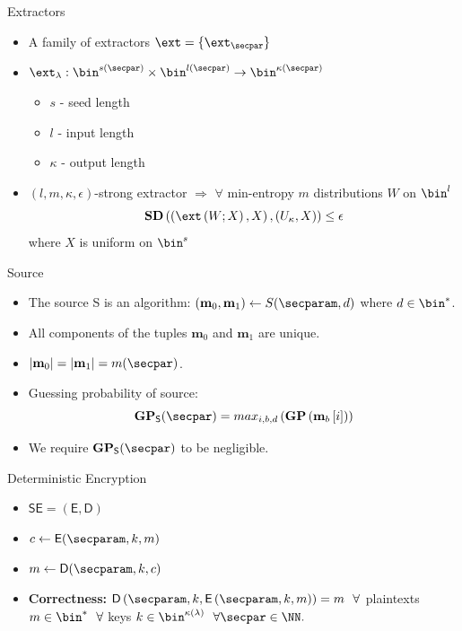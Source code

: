 \documentclass{beamer}
\newcommand{\smzero}{\textbf{m}_0}
\newcommand{\smone}{\textbf{m}_1}
\begin{document}
\begin{frame}{Extractors}
	\begin{itemize}
		\setlength\itemsep{1em}
		\item A family of extractors $\ext = \{\ext_{\secpar}\}$
		\item $\ext_{\lambda} : \bin^{s(\secpar)} \times \bin^{l(\secpar)} \rightarrow \bin^{\kappa(\secpar)}$
		\begin{itemize}
		    \item $s$ - seed length
		    \item $l$ - input length 
		    \item $\kappa$ - output length
		\end{itemize}
		\item $(l,m,\kappa,\epsilon)$-strong extractor $\Rightarrow$ $\forall$ min-entropy  $m$ distributions $W$ on $\bin^l$
		    \begin{equation*}
		        \textbf{SD}\left(\left( \ext\left( W; X\right), X \right), \left( U_\kappa,X \right) \right) \leq \epsilon
		    \end{equation*}
		 where $X$ is uniform on $\bin^s$
	\end{itemize}
\end{frame}

\begin{frame}{Source}
	\begin{itemize}
		\setlength\itemsep{1em}
		\item The source S is an algorithm: $(\smzero, \smone) \leftarrow S(\secparam, d)$ where $d \in \bin^*$.
		\item All components of the tuples $\smzero$ and $\smone$ are unique.
		\item $|\smzero| = |\smone|= m(\secpar)$.
		\item Guessing probability of source:
		    \begin{equation*}
                \textbf{GP}_\mathsf{S}(\secpar) = max_{i,b,d}\left( \textbf{GP}\left( \textbf{m}_b \left[ i \right] \right) \right)
            \end{equation*}
        \item We require $\textbf{GP}_\mathsf{S}(\secpar)$ to be negligible.
	\end{itemize}
\end{frame}

\begin{frame}{Deterministic Encryption}
	\begin{itemize}
		\setlength\itemsep{1em}
		\item $\mathsf{SE=(E, D)}$
		\item $c \leftarrow \mathsf{E}(\secparam, k, m)$
		\item $m \leftarrow \mathsf{D}(\secparam, k, c)$
		\item \textbf{Correctness:}  $\mathsf{D} \left( \secparam , k, \mathsf{E} \left( \secparam , k, m \right) \right) = m\ \  \forall$  plaintexts $m \in \bin^*\ \  \forall$  keys $k \in \bin^{\kappa(\lambda)}\ \   \forall \secpar \in \NN.$
	\end{itemize}
\end{frame}
\end{document}
